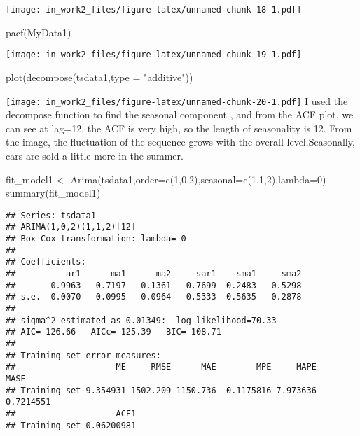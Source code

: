 \documentclass[
]{article}
\newenvironment{Shaded}{\begin{snugshade}}{\end{snugshade}}
\newcommand{\AttributeTok}[1]{\textcolor[rgb]{0.77,0.63,0.00}{#1}}
\newcommand{\DecValTok}[1]{\textcolor[rgb]{0.00,0.00,0.81}{#1}}
\newcommand{\FunctionTok}[1]{\textcolor[rgb]{0.00,0.00,0.00}{#1}}
\newcommand{\NormalTok}[1]{#1}
\newcommand{\OtherTok}[1]{\textcolor[rgb]{0.56,0.35,0.01}{#1}}
\newcommand{\StringTok}[1]{\textcolor[rgb]{0.31,0.60,0.02}{#1}}
\begin{document}
\texttt{[image: in\_work2\_files/figure-latex/unnamed-chunk-18-1.pdf]}

\begin{Shaded}
\begin{Highlighting}[]
\FunctionTok{pacf}\NormalTok{(MyData1)}
\end{Highlighting}
\end{Shaded}

\texttt{[image: in\_work2\_files/figure-latex/unnamed-chunk-19-1.pdf]}

\begin{Shaded}
\begin{Highlighting}[]
\FunctionTok{plot}\NormalTok{(}\FunctionTok{decompose}\NormalTok{(tsdata1,}\AttributeTok{type =} \StringTok{"additive"}\NormalTok{))}
\end{Highlighting}
\end{Shaded}

\texttt{[image: in\_work2\_files/figure-latex/unnamed-chunk-20-1.pdf]} I
used the decompose function to find the seasonal component , and from
the ACF plot, we can see at lag=12, the ACF is very high, so the length
of seasonality is 12. From the image, the fluctuation of the sequence
grows with the overall level.Seasonally, cars are sold a little more in
the summer.

\begin{Shaded}
\begin{Highlighting}[]
\NormalTok{  fit\_model1 }\OtherTok{\textless{}{-}} \FunctionTok{Arima}\NormalTok{(tsdata1,}\AttributeTok{order=}\FunctionTok{c}\NormalTok{(}\DecValTok{1}\NormalTok{,}\DecValTok{0}\NormalTok{,}\DecValTok{2}\NormalTok{),}\AttributeTok{seasonal=}\FunctionTok{c}\NormalTok{(}\DecValTok{1}\NormalTok{,}\DecValTok{1}\NormalTok{,}\DecValTok{2}\NormalTok{),}\AttributeTok{lambda=}\DecValTok{0}\NormalTok{)}
  \FunctionTok{summary}\NormalTok{(fit\_model1)}
\end{Highlighting}
\end{Shaded}

\begin{verbatim}
## Series: tsdata1 
## ARIMA(1,0,2)(1,1,2)[12] 
## Box Cox transformation: lambda= 0 
## 
## Coefficients:
##          ar1      ma1      ma2     sar1    sma1     sma2
##       0.9963  -0.7197  -0.1361  -0.7699  0.2483  -0.5298
## s.e.  0.0070   0.0995   0.0964   0.5333  0.5635   0.2878
## 
## sigma^2 estimated as 0.01349:  log likelihood=70.33
## AIC=-126.66   AICc=-125.39   BIC=-108.71
## 
## Training set error measures:
##                    ME     RMSE      MAE        MPE     MAPE      MASE
## Training set 9.354931 1502.209 1150.736 -0.1175816 7.973636 0.7214551
##                    ACF1
## Training set 0.06200981
\end{verbatim}
\end{document}
